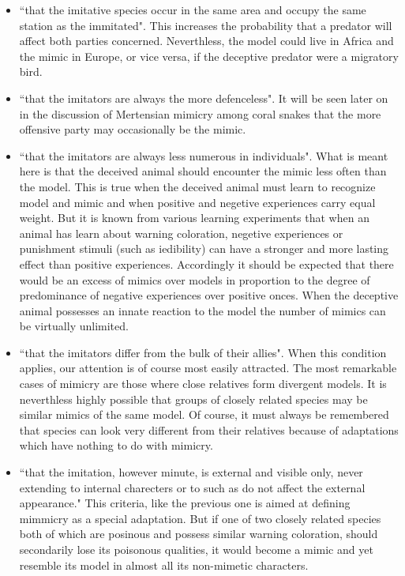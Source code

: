 \begin{itemize}
	\item ``that the imitative species occur in the same area and occupy the same station as the immitated". This increases the probability that a predator will affect both parties concerned. Neverthless, the model could live in Africa and the mimic in Europe, or vice versa, if the deceptive predator were a migratory bird.
	\item ``that the imitators are always the more defenceless". It will be seen later on in the discussion of Mertensian mimicry among coral snakes that the more offensive party may occasionally be the mimic. 
	\item ``that the imitators are always less numerous in individuals". What is meant here is that the deceived animal should encounter the mimic less often than the model. This is true when the deceived animal must learn to recognize model and mimic and when positive and negetive experiences carry equal weight. But it is known from various learning experiments that when an animal has learn about warning coloration, negetive experiences or punishment stimuli (such as iedibility) can have a stronger and more lasting effect than positive experiences. Accordingly it should be expected that there would be an excess of mimics over models in proportion to the degree of predominance of negative experiences over positive onces. When the deceptive animal possesses an innate reaction to the model the number of mimics can be virtually unlimited. 
	\item ``that the imitators differ from the bulk of their allies". When this condition applies, our attention is of course most easily attracted. The most remarkable cases of mimicry are those where close relatives form divergent models. It is neverthless highly possible that groups of closely related species may be similar mimics of the same model. Of course, it must always be remembered that species can look very different from their relatives because of adaptations which have nothing to do with mimicry. 
	\item ``that the imitation, however minute, is external and visible only, never extending to internal charecters or to such as do not affect the external appearance." This criteria, like the previous one is aimed at defining mimmicry as a special adaptation. But if one of two closely related species both of which are posinous and possess similar warning coloration, should secondarily lose its poisonous qualities, it would become a mimic and yet resemble its model in almost all its non-mimetic characters.
\end{itemize}

